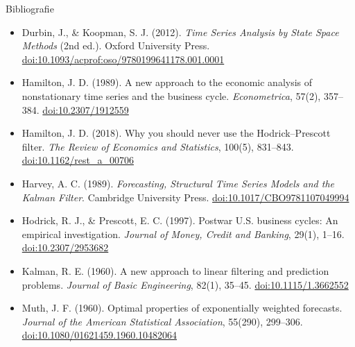 \begin{frame}{Bibliografie}
\itemsize{\tiny}
\begin{itemize}
    \item Durbin, J., \& Koopman, S. J. (2012). \textit{Time Series Analysis by State Space Methods} (2nd ed.). Oxford University Press. \href{https://doi.org/10.1093/acprof:oso/9780199641178.001.0001}{doi:10.1093/acprof:oso/9780199641178.001.0001}
    \item Hamilton, J. D. (1989). A new approach to the economic analysis of nonstationary time series and the business cycle. \textit{Econometrica}, 57(2), 357--384. \href{https://doi.org/10.2307/1912559}{doi:10.2307/1912559}
    \item Hamilton, J. D. (2018). Why you should never use the Hodrick--Prescott filter. \textit{The Review of Economics and Statistics}, 100(5), 831--843. \href{https://doi.org/10.1162/rest\_a\_00706}{doi:10.1162/rest\_a\_00706}
    \item Harvey, A. C. (1989). \textit{Forecasting, Structural Time Series Models and the Kalman Filter}. Cambridge University Press. \href{https://doi.org/10.1017/CBO9781107049994}{doi:10.1017/CBO9781107049994}
    \item Hodrick, R. J., \& Prescott, E. C. (1997). Postwar U.S. business cycles: An empirical investigation. \textit{Journal of Money, Credit and Banking}, 29(1), 1--16. \href{https://doi.org/10.2307/2953682}{doi:10.2307/2953682}
    \item Kalman, R. E. (1960). A new approach to linear filtering and prediction problems. \textit{Journal of Basic Engineering}, 82(1), 35--45. \href{https://doi.org/10.1115/1.3662552}{doi:10.1115/1.3662552}
    \item Muth, J. F. (1960). Optimal properties of exponentially weighted forecasts. \textit{Journal of the American Statistical Association}, 55(290), 299--306. \href{https://doi.org/10.1080/01621459.1960.10482064}{doi:10.1080/01621459.1960.10482064}
\end{itemize}
\end{frame}


